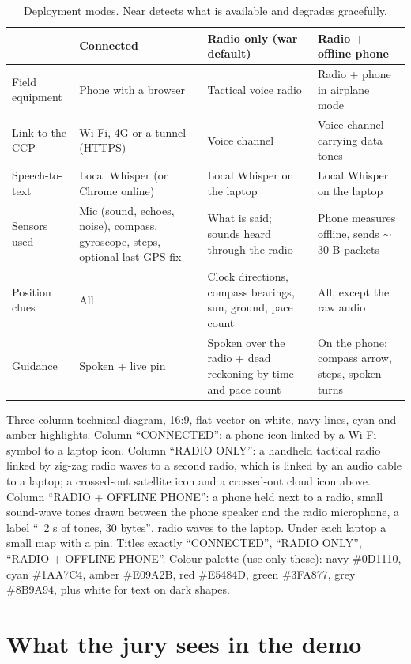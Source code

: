\begin{table}[htbp]\centering\small
\caption{Deployment modes. Near detects what is available and degrades gracefully.}\label{tab:modes}
\begin{tabularx}{\linewidth}{lXXX}
\toprule
& Connected & Radio only (war default) & Radio + offline phone\\
\midrule
Field equipment & Phone with a browser & Tactical voice radio & Radio + phone in airplane mode\\
Link to the CCP & Wi-Fi, 4G or a tunnel (HTTPS) & Voice channel & Voice channel carrying data tones\\
Speech-to-text & Local Whisper (or Chrome online) & Local Whisper on the laptop & Local Whisper on the laptop\\
Sensors used & Mic (sound, echoes, noise), compass, gyroscope, steps, optional last GPS fix & What is said; sounds heard through the radio & Phone measures offline, sends $\sim$30 B packets\\
Position clues & All & Clock directions, compass bearings, sun, ground, pace count & All, except the raw audio\\
Guidance & Spoken + live pin & Spoken over the radio + dead reckoning by time and pace count & On the phone: compass arrow, steps, spoken turns\\
\bottomrule
\end{tabularx}
\end{table}

{Three-column technical diagram, 16:9, flat vector on white, navy lines, cyan and amber highlights. Column
``CONNECTED'': a phone icon linked by a Wi-Fi symbol to a laptop icon. Column ``RADIO ONLY'': a handheld tactical
radio linked by zig-zag radio waves to a second radio, which is linked by an audio cable to a laptop; a crossed-out
satellite icon and a crossed-out cloud icon above. Column ``RADIO + OFFLINE PHONE'': a phone held next to a radio,
small sound-wave tones drawn between the phone speaker and the radio microphone, a label ``~2 s of tones,
30 bytes'', radio waves to the laptop. Under each laptop a small map with a pin. Titles exactly ``CONNECTED'',
``RADIO ONLY'', ``RADIO + OFFLINE PHONE''. Colour palette (use only these): navy \#0D1110, cyan \#1AA7C4, amber \#E09A2B, red \#E5484D, green \#3FA877, grey \#8B9A94, plus white for text on dark shapes.}

\section{What the jury sees in the demo}

